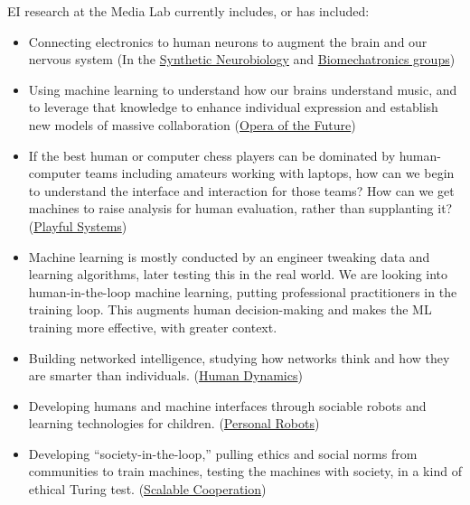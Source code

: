 EI research at the Media Lab currently includes, or has included:
\begin{itemize}
\item Connecting electronics to human neurons to augment the brain and our nervous system (In the \href{https://www.media.mit.edu/groups/synthetic-neurobiology/overview/}{Synthetic Neurobiology} and \href{https://www.media.mit.edu/groups/biomechatronics/overview/}{Biomechatronics groups})

\item Using machine learning to understand how our brains understand music, and to leverage that knowledge to enhance individual expression and establish new models of massive collaboration (\href{https://www.media.mit.edu/groups/opera-of-the-future/overview/}{Opera of the Future})

\item If the best human or computer chess players can be dominated by human-computer teams including amateurs working with laptops, how can we begin to understand the interface and interaction for those teams? How can we get machines to raise analysis for human evaluation, rather than supplanting it? (\href{https://www.media.mit.edu/groups/playful-systems/overview/}{Playful Systems})

\item Machine learning is mostly conducted by an engineer tweaking data and learning algorithms, later testing this in the real world. We are looking into human-in-the-loop machine learning, putting professional practitioners in the training loop. This augments human decision-making and makes the ML training more effective, with greater context.

\item Building networked intelligence, studying how networks think and how they are smarter than individuals. (\href{https://www.media.mit.edu/groups/human-dynamics/overview/}{Human Dynamics})

\item Developing humans and machine interfaces through sociable robots and learning technologies for children. (\href{https://www.media.mit.edu/groups/personal-robots/overview/}{Personal Robots})

\item Developing ``society-in-the-loop,'' pulling ethics and social norms from communities to train machines, testing the machines with society, in a kind of ethical Turing test. (\href{https://www.media.mit.edu/groups/scalable-cooperation/overview/}{Scalable Cooperation})


\end{itemize}
